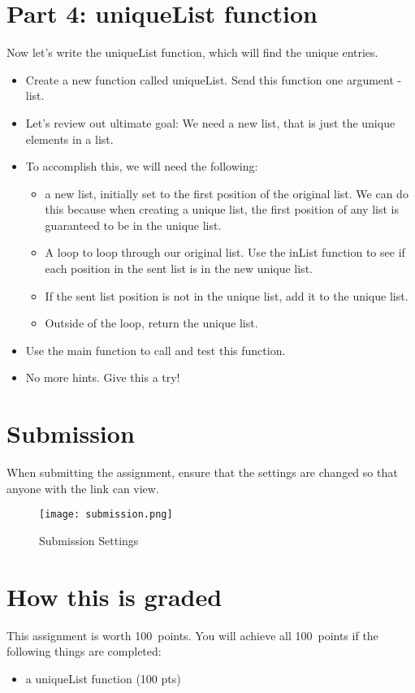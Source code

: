 \documentclass{article}
\newcommand{\AValue}{100}
\begin{document}
\section*{Part 4: uniqueList function}
Now let's write the uniqueList function, which will find the unique entries.
\begin{itemize}
    \item Create a new function called uniqueList.  Send this function one argument - list.
    \item Let's review out ultimate goal:  We need a new list, that is just the unique elements in a list.
    \item To accomplish this, we will need the following:
    \begin{itemize}
    		\item a new list, initially set to the first position of the original list.  We can do this because when creating a unique list, the first position of any list is guaranteed to be in the unique list.
    		\item A loop to loop through our original list.  Use the inList function to see if each position in the sent list is in the new unique list.
    		\item If the sent list position is not in the unique list, add it to the unique list.  
    		\item Outside of the loop, return the unique list.
    	\end{itemize}
    	\item Use the main function to call and test this function.
    	\item No more hints.  Give this a try!
\end{itemize}

\section*{Submission}
When submitting the assignment, ensure that the settings are changed so that anyone with the link can view.
\begin{figure}[H]
  \centering
  \texttt{[image: submission.png]}
  \caption{Submission Settings}
\end{figure}

\section*{How this is graded}
This assignment is worth \AValue \ points. You will achieve all \AValue \   points if the following things are completed:
\begin{itemize}
    \item a uniqueList function (100 pts)
\end{itemize}
\end{document}
